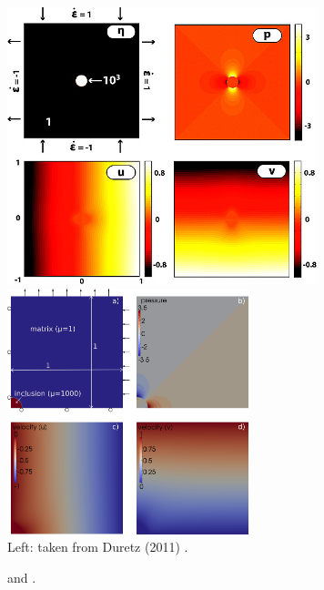 \begin{center}
\includegraphics[width=9cm]{images/benchmark_solvi/dumg11}
\includegraphics[width=7cm]{images/benchmark_solvi/drawing}\\
{\captionfont Left: taken from Duretz \etal (2011) \cite{dumg11}. }
\end{center}

 
\cite{kapo06,maie12,deka08,bepo10,sunh10,vosc15,demh19,aspectmanual,litu02} 
\cite{krhb12} and \cite{gemd13}.
